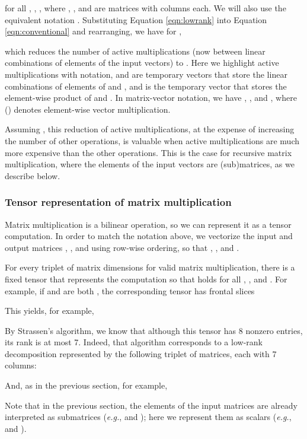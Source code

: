 \documentclass[preprint]{sigplanconf}
\begin{document}
for all , , , where , , and  are matrices with  columns each.
We will also use the equivalent notation .
Substituting Equation \eqref{eqn:lowrank} into Equation \eqref{eqn:conventional} and rearranging, we have for ,

which reduces the number of active multiplications (now between linear combinations of elements of the input vectors) to .
Here we highlight active multiplications with  notation,  and  are temporary vectors that store the linear combinations of elements of  and , and  is the temporary vector that stores the element-wise product of  and .  
In matrix-vector notation, we have , , and , where () denotes element-wise vector multiplication.

Assuming , this reduction of active multiplications, at the expense of increasing the number of other operations, is valuable when active multiplications are much more expensive than the other operations.
This is the case for recursive matrix multiplication, where the elements of the input vectors are (sub)matrices, as we describe below.


\subsubsection{Tensor representation of matrix multiplication}

Matrix multiplication is a bilinear operation, so we can represent it as a tensor computation. 
In order to match the notation above, we vectorize the input and output matrices , , and  using row-wise ordering, so that , , and . 

For every triplet of matrix dimensions for valid matrix multiplication, there is a fixed tensor that represents the computation so that  holds for all , , and .
For example, if  and  are both , the corresponding  tensor  has frontal slices

This yields, for example,


By Strassen's algorithm, we know that although this tensor has 8 nonzero entries, its rank is at most 7.
Indeed, that algorithm corresponds to a low-rank decomposition represented by the following triplet of matrices, each with 7 columns:

And, as in the previous section, for example,

Note that in the previous section, the elements of the input matrices are already interpreted as submatrices (\emph{e.g.},  and ); here we represent them as scalars (\emph{e.g.},  and ).
\end{document}
